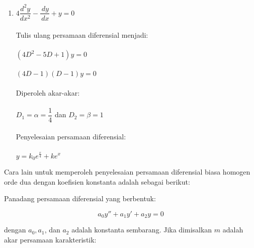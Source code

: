 \begin{enumerate}[1.]
	\item \begin{math} 4 \dfrac{d^{2}y}{dx^{2}} - \dfrac{\, dy}{\, dx} + y = 0 \end{math} \\ \\
	Tulis ulang persamaan diferensial menjadi: \\ \\
	\begin{math} (4D^{2} - 5D + 1)y = 0 \end{math} \\ \\
	\begin{math} (4D - 1) (D - 1)y = 0 \end{math} \\ \\
	Diperoleh akar-akar: \\ \\
	\begin{math} D_1 = \alpha = \dfrac{1}{4} \end{math} dan \begin{math} D_2 = \beta = 1 \end{math} \\ \\
	Penyelesaian persamaan diferensial: \\ \\
	\begin{math} y = k_0 e^{\frac{x}{4}} + ke^{x} \end{math}

\end{enumerate}

Cara lain untuk memperoleh penyelesaian persamaan diferensial biasa homogen orde dua dengan koefisien konstanta adalah sebagai berikut:

Panadang persamaan diferensial yang berbentuk:

\begin{displaymath} a_0 y'' + a_1 y' + a_2 y = 0 \end{displaymath}

dengan  \begin{math} a_0, a_1 \end{math}, dan \begin{math} a_2 \end{math} adalah konstanta sembarang. Jika dimisalkan \begin{math} m \end{math} adalah akar persamaan karakteristik:


